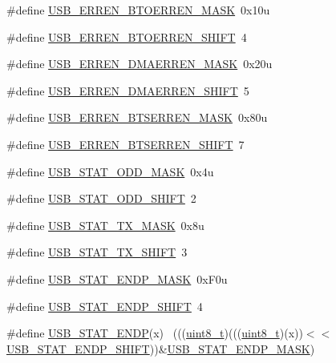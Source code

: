\begin{DoxyCompactItemize}
\#define \hyperlink{group___u_s_b___register___masks_ga3e02cf7d8b6fce5077848051a320c609}{U\+S\+B\+\_\+\+E\+R\+R\+E\+N\+\_\+\+B\+T\+O\+E\+R\+R\+E\+N\+\_\+\+M\+A\+SK}~0x10u
\item 
\#define \hyperlink{group___u_s_b___register___masks_ga6df540868c71ce6e3c7b8737a048c2aa}{U\+S\+B\+\_\+\+E\+R\+R\+E\+N\+\_\+\+B\+T\+O\+E\+R\+R\+E\+N\+\_\+\+S\+H\+I\+FT}~4
\item 
\#define \hyperlink{group___u_s_b___register___masks_gae1e237556956a0eb5e669aadded213b8}{U\+S\+B\+\_\+\+E\+R\+R\+E\+N\+\_\+\+D\+M\+A\+E\+R\+R\+E\+N\+\_\+\+M\+A\+SK}~0x20u
\item 
\#define \hyperlink{group___u_s_b___register___masks_ga8b75afb2fa004a75b39023e38db4e784}{U\+S\+B\+\_\+\+E\+R\+R\+E\+N\+\_\+\+D\+M\+A\+E\+R\+R\+E\+N\+\_\+\+S\+H\+I\+FT}~5
\item 
\#define \hyperlink{group___u_s_b___register___masks_ga806a809f05df66a7669733c599646f7f}{U\+S\+B\+\_\+\+E\+R\+R\+E\+N\+\_\+\+B\+T\+S\+E\+R\+R\+E\+N\+\_\+\+M\+A\+SK}~0x80u
\item 
\#define \hyperlink{group___u_s_b___register___masks_ga5e760a100c4f43ecfd71952a5f393d77}{U\+S\+B\+\_\+\+E\+R\+R\+E\+N\+\_\+\+B\+T\+S\+E\+R\+R\+E\+N\+\_\+\+S\+H\+I\+FT}~7
\item 
\#define \hyperlink{group___u_s_b___register___masks_ga49caa3c5b36fc89eadadd60cdf331643}{U\+S\+B\+\_\+\+S\+T\+A\+T\+\_\+\+O\+D\+D\+\_\+\+M\+A\+SK}~0x4u
\item 
\#define \hyperlink{group___u_s_b___register___masks_ga15f3e2fa671ea1a59e0b24a9697faf8a}{U\+S\+B\+\_\+\+S\+T\+A\+T\+\_\+\+O\+D\+D\+\_\+\+S\+H\+I\+FT}~2
\item 
\#define \hyperlink{group___u_s_b___register___masks_gab953f904ef3a2b838a922ebdf69cf140}{U\+S\+B\+\_\+\+S\+T\+A\+T\+\_\+\+T\+X\+\_\+\+M\+A\+SK}~0x8u
\item 
\#define \hyperlink{group___u_s_b___register___masks_ga5173e8423017932d90919ddb18f918bd}{U\+S\+B\+\_\+\+S\+T\+A\+T\+\_\+\+T\+X\+\_\+\+S\+H\+I\+FT}~3
\item 
\#define \hyperlink{group___u_s_b___register___masks_gad8a184e838de511e23aa32011fc9f0b6}{U\+S\+B\+\_\+\+S\+T\+A\+T\+\_\+\+E\+N\+D\+P\+\_\+\+M\+A\+SK}~0x\+F0u
\item 
\#define \hyperlink{group___u_s_b___register___masks_ga5d85a4b028002bc9ce0f1650111cd49a}{U\+S\+B\+\_\+\+S\+T\+A\+T\+\_\+\+E\+N\+D\+P\+\_\+\+S\+H\+I\+FT}~4
\item 
\#define \hyperlink{group___u_s_b___register___masks_gad3e8103c4490cdec9585e10998f3e4b2}{U\+S\+B\+\_\+\+S\+T\+A\+T\+\_\+\+E\+N\+DP}(x)                                              ~(((\hyperlink{_p_e___types_8h_aba7bc1797add20fe3efdf37ced1182c5}{uint8\+\_\+t})(((\hyperlink{_p_e___types_8h_aba7bc1797add20fe3efdf37ced1182c5}{uint8\+\_\+t})(x))$<$$<$\hyperlink{group___u_s_b___register___masks_ga5d85a4b028002bc9ce0f1650111cd49a}{U\+S\+B\+\_\+\+S\+T\+A\+T\+\_\+\+E\+N\+D\+P\+\_\+\+S\+H\+I\+FT}))\&\hyperlink{group___u_s_b___register___masks_gad8a184e838de511e23aa32011fc9f0b6}{U\+S\+B\+\_\+\+S\+T\+A\+T\+\_\+\+E\+N\+D\+P\+\_\+\+M\+A\+SK})
$$
\end{DoxyCompactItemize}
